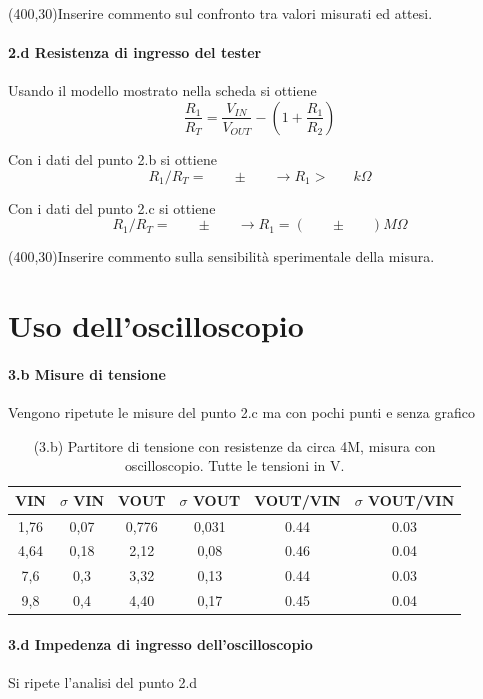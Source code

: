 \documentclass[10pt,a4paper]{article}
\newcommand{\exn}{\phantom{xxx}}
\begin{document}
\framebox(400,30){Inserire commento sul confronto tra valori misurati ed attesi.}



\paragraph{2.d Resistenza di ingresso del tester}
Usando il modello mostrato nella scheda si ottiene
\[ \frac{R_1}{R_T} =  \frac{V_{IN}}{V_{OUT}} - (1 +  \frac{R_1}{R_2} )
\]

Con i dati del punto 2.b si ottiene
\[ R_1/R_T = \exn  \pm  \exn   \rightarrow  R_1 > \exn k\Omega
\]


Con i dati del punto 2.c si ottiene
\[ R_1/R_T = \exn  \pm  \exn   \rightarrow  R_1 = (\exn \pm  \exn)  M\Omega
\]


\framebox(400,30){Inserire commento sulla sensibilit\`a sperimentale della misura.} 


\section{Uso dell'oscilloscopio}

\paragraph{3.b Misure di tensione} 
Vengono ripetute le misure del punto 2.c  ma con pochi punti e senza grafico
\begin{table}[h]
\centering
\begin{tabular}{|c|c|c|c|c|c|}
\hline 
VIN& $\sigma$ VIN  &VOUT	 & $\sigma$ VOUT& VOUT/VIN & $\sigma$ VOUT/VIN \\
\hline 
1,76 & 0,07 & 0,776 & 0,031 & 0.44 & 0.03\\
4,64 & 0,18 & 2,12 & 0,08 & 0.46 & 0.04 \\
7,6 & 0,3 & 3,32 & 0,13 & 0.44 & 0.03 \\
9,8 & 0,4 & 4,40 & 0,17 & 0.45 & 0.04 \\
\hline 
\end{tabular} 
\caption{(3.b) Partitore di tensione con resistenze da circa 4M, misura con oscilloscopio. Tutte le tensioni in V.}
\end{table}


\paragraph{3.d Impedenza di ingresso dell'oscilloscopio} Si ripete l'analisi del punto 2.d
\end{document}
